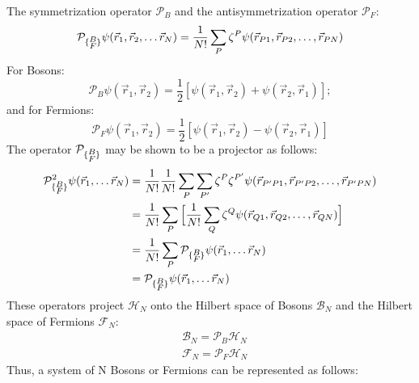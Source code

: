 \documentclass[12pt]{article}
\begin{document}
The symmetrization operator $\mathcal{P}_B$ and the antisymmetrization operator 
$\mathcal{P}_F$:
\begin{equation*}
    \mathcal{P}_{\{\substack{\small B\\\small F}\}}\psi(\vec{r}_1,\vec{r}_2,\dots\vec{r}_N)
    =\frac{1}{N!}\sum_P\zeta^P\psi(\vec{r}_{P1},\vec{r}_{P2},\dots,\vec{r}_{PN})
\end{equation*}
For Bosons:
\begin{equation*}
    \mathcal{P}_B\psi(\vec{r}_1,\vec{r}_2)=\frac{1}{2}[\psi(\vec{r}_1,\vec{r}_2)
    +\psi(\vec{r}_2,\vec{r}_1)];
\end{equation*}
and for Fermions:
\begin{equation*}
    \mathcal{P}_F\psi(\vec{r}_1,\vec{r}_2)=\frac{1}{2}[\psi(\vec{r}_1,\vec{r}_2)
    -\psi(\vec{r}_2,\vec{r}_1)]
\end{equation*}
The operator $\mathcal{P}_{\{\substack{\small B\\\small F}\}}$ may be shown to be a 
projector as follows:
\begin{equation*}
    \begin{split}
        \mathcal{P}^2_{\{\substack{\small B\\\small F}\}}\psi(\vec{r}_1,\dots\vec{r}_N)
        &=\frac{1}{N!}\frac{1}{N!}\sum_{P}\sum_{P'}\zeta^P\zeta^{P'}
        \psi(\vec{r}_{P'P1},\vec{r}_{P'P2},\dots,\vec{r}_{P'PN})\\
        &=\frac{1}{N!}\sum_P\Big[\frac{1}{N!}\sum_Q\zeta^Q
        \psi(\vec{r}_{Q1},\vec{r}_{Q2},\dots,\vec{r}_{QN})\Big]\\
        &=\frac{1}{N!}\sum_P\mathcal{P}_{\{\substack{\small B\\\small F}\}}
        \psi(\vec{r}_1,\dots\vec{r}_N)\\
        &=\mathcal{P}_{\{\substack{\small B\\\small F}\}}\psi(\vec{r}_1,\dots\vec{r}_N)
    \end{split}
\end{equation*}
These operators project $\mathcal{H}_N$ onto the Hilbert space of Bosons $\mathcal{B}_N$ 
and the Hilbert space of Fermions $\mathcal{F}_N$:
\begin{equation*}
    \begin{split}
        &\mathcal{B}_N=\mathcal{P}_B\mathcal{H}_N\\
        &\mathcal{F}_N=\mathcal{P}_F\mathcal{H}_N
    \end{split}
\end{equation*}
Thus, a system of N Bosons or Fermions can be represented as follows:
\end{document}
